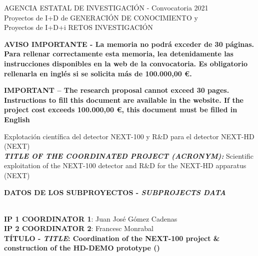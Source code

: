 \documentclass[a4paper,11pt,oneside, english]{article}
\begin{document}
\begin{tcolorbox}[colback=white,arc=0pt,outer arc=0pt,colframe=black,boxrule=0.6pt]
  \begin{center}
    AGENCIA ESTATAL DE INVESTIGACI\'ON - Convocatoria 2021\\
    Proyectos de I+D de GENERACI\'ON DE CONOCIMIENTO y\\
    Proyectos de I+D+i RETOS INVESTIGACI\'ON
  \end{center}
\end{tcolorbox}
\vspace{-0.2cm}
\begin{tcolorbox}[colback=yellow,arc=0pt,outer arc=0pt,colframe=black,boxrule=0.6pt,left=0mm,right=0mm]
  \begin{center}
    {\bf \small AVISO IMPORTANTE - La memoria no podr\'a exceder de 30 p\'aginas. Para rellenar
      correctamente esta memoria, lea detenidamente las instrucciones disponibles en la web de la
      convocatoria. Es obligatorio rellenarla en ingl\'es si se solicita m\'as de 100.000,00 \euro.}
  \end{center}
  \begin{center}
    {\bf \small IMPORTANT -- The research proposal cannot exceed 30 pages. Instructions to fill this document
      are available in the website. If the project cost exceeds 100.000,00 \euro, this document must be
      filled in English}
  \end{center}
\end{tcolorbox}
 Explotación científica del detector NEXT-100 y R\&D para el detector NEXT-HD (NEXT) \\
{\bf \emph{TITLE OF THE COORDINATED PROJECT (ACRONYM):}} Scientific exploitation of the NEXT-100 detector and R\&D for the NEXT-HD apparatus (NEXT)
\vspace{3pt}
\begin{tcolorbox}[colback=white,arc=0pt,outer arc=0pt,colframe=black,boxrule=0.6pt,left=0mm]
  \textbf{DATOS DE LOS SUBPROYECTOS - \emph{SUBPROJECTS DATA}}
\end{tcolorbox}
\\
{\bf IP 1 COORDINATOR 1}: Juan Jos\'e G\'omez Cadenas\\
{\bf IP 2 COORDINATOR 2}: Francesc Monrabal\\
{\bf T\'ITULO - \emph{TITLE}: Coordination of the NEXT-100 project \& construction of the HD-DEMO prototype (\sDIPC)}\\
\end{document}
